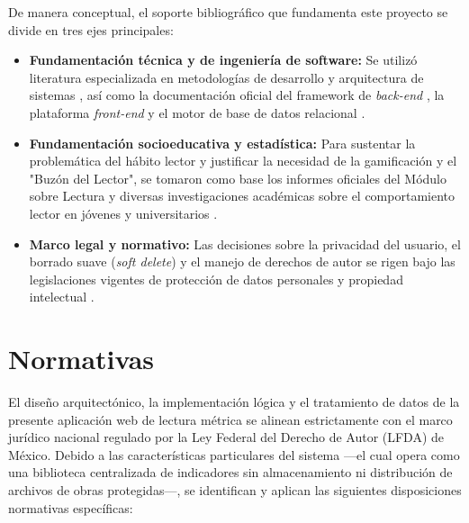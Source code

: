 \documentclass[12pt, atypical, journal]{article}
\begin{document}
De manera conceptual, el soporte bibliográfico que fundamenta este proyecto se divide en tres ejes principales:
\begin{itemize}
    \item \textbf{Fundamentación técnica y de ingeniería de software:} Se utilizó literatura especializada en metodologías de desarrollo y arquitectura de sistemas \cite{sommerville2016, martin2018}, así como la documentación oficial del framework de \textit{back-end} \cite{spring2025}, la plataforma \textit{front-end} \cite{nextjs2025} y el motor de base de datos relacional \cite{postgres2025}.
    \item \textbf{Fundamentación socioeducativa y estadística:} Para sustentar la problemática del hábito lector y justificar la necesidad de la gamificación y el "Buzón del Lector", se tomaron como base los informes oficiales del Módulo sobre Lectura \cite{inegi2025} y diversas investigaciones académicas sobre el comportamiento lector en jóvenes y universitarios \cite{dialnet2024, ocnos2009, eciencias2020}.
    \item \textbf{Marco legal y normativo:} Las decisiones sobre la privacidad del usuario, el borrado suave (\textit{soft delete}) y el manejo de derechos de autor se rigen bajo las legislaciones vigentes de protección de datos personales y propiedad intelectual \cite{lfpdppp, lfda2026, chiapas2017}.
\end{itemize}

\newpage

\section{Normativas}
El diseño arquitectónico, la implementación lógica y el tratamiento de datos de la presente aplicación web de lectura métrica se alinean estrictamente con el marco jurídico nacional regulado por la Ley Federal del Derecho de Autor (LFDA) de México. Debido a las características particulares del sistema ---el cual opera como una biblioteca centralizada de indicadores sin almacenamiento ni distribución de archivos de obras protegidas---, se identifican y aplican las siguientes disposiciones normativas específicas:
\end{document}
